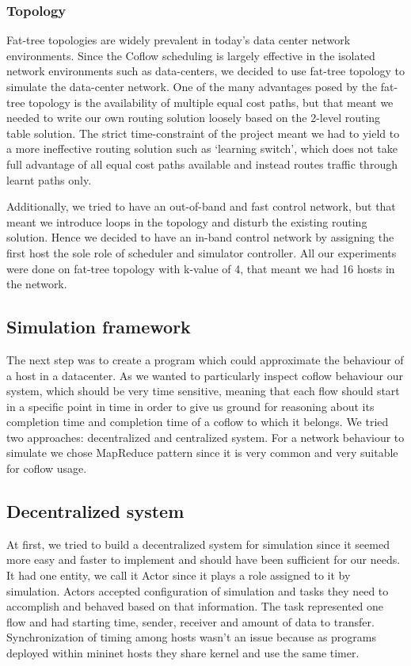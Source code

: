 \documentclass[conference]{IEEEtran}
\begin{document}
\subsubsection{Topology}
Fat-tree topologies are widely prevalent in today's data center network environments. Since the Coflow scheduling is largely effective in the isolated network environments such as data-centers, we decided to use fat-tree topology to simulate the data-center network. One of the many advantages posed by the fat-tree topology is the availability of multiple equal cost paths, but that meant we needed to write our own routing solution loosely based on the 2-level routing table solution\cite{fattree}. The strict time-constraint of the project meant we had to yield to a more ineffective routing solution such as ‘learning switch’, which does not take full advantage of all equal cost paths available and instead routes traffic through learnt paths only. 

Additionally, we tried to have an out-of-band and fast control network, but that meant we introduce loops in the topology and disturb the existing routing solution. Hence we decided to have an in-band control network by assigning the first host the sole role of scheduler and simulator controller. All our experiments were done on fat-tree topology with k-value of 4, that meant we had 16 hosts in the network.

\subsection{Simulation framework}
The next step was to create a program which could approximate the behaviour of a host in a datacenter. As we wanted to particularly inspect coflow behaviour our system, which should be very time sensitive, meaning that each flow should start in a specific point in time in order to give us ground for reasoning about its completion time and completion time of a coflow to which it belongs. We tried two approaches: decentralized and centralized system. For a network behaviour to simulate we chose MapReduce pattern since it is very common and very suitable for coflow usage.

\subsection{Decentralized system}
At first, we tried to build a decentralized system for simulation since it seemed more easy and faster to implement and should have been sufficient for our needs. It had one entity, we call it Actor since it plays a role assigned to it by simulation. Actors accepted configuration of simulation and tasks they need to accomplish and behaved based on that information. The task represented one flow and had starting time, sender, receiver and amount of data to transfer. Synchronization of timing among hosts wasn’t an issue because as programs deployed within mininet hosts they share kernel and use the same timer. 
\end{document}
